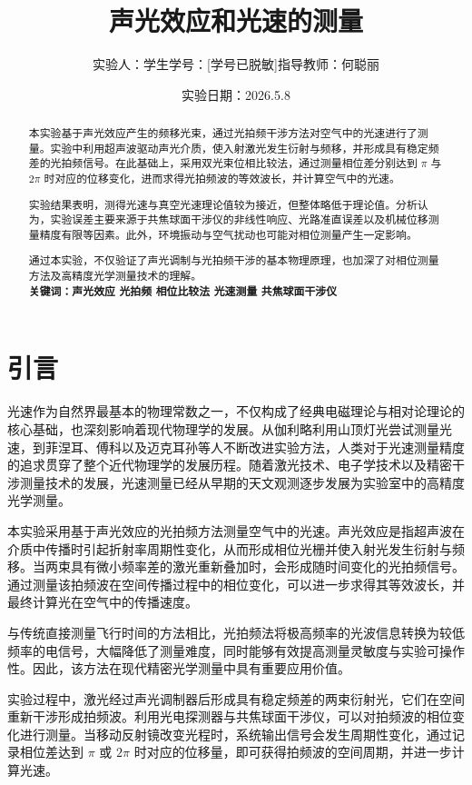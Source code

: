 \documentclass[a4paper]{ctexart}
\title{声光效应和光速的测量}
\author{实验人：学生\qquad 学号：[学号已脱敏]\qquad 指导教师：何聪丽}
\date{实验日期：2026.5.8}
\begin{document}
    
    \maketitle
    
    \begin{abstract}

本实验基于声光效应产生的频移光束，通过光拍频干涉方法对空气中的光速进行了测量。实验中利用超声波驱动声光介质，使入射激光发生衍射与频移，并形成具有稳定频差的光拍频信号。在此基础上，采用双光束位相比较法，通过测量相位差分别达到 $\pi$ 与 $2\pi$ 时对应的位移变化，进而求得光拍频波的等效波长，并计算空气中的光速。

实验结果表明，测得光速与真空光速理论值较为接近，但整体略低于理论值。分析认为，实验误差主要来源于共焦球面干涉仪的非线性响应、光路准直误差以及机械位移测量精度有限等因素。此外，环境振动与空气扰动也可能对相位测量产生一定影响。

通过本实验，不仅验证了声光调制与光拍频干涉的基本物理原理，也加深了对相位测量方法及高精度光学测量技术的理解。\\

\textbf{关键词：声光效应 \quad 光拍频 \quad 相位比较法 \quad 光速测量 \quad 共焦球面干涉仪}

\end{abstract}
    
    \section{引言}

光速作为自然界最基本的物理常数之一，不仅构成了经典电磁理论与相对论理论的核心基础，也深刻影响着现代物理学的发展。从伽利略利用山顶灯光尝试测量光速，到菲涅耳、傅科以及迈克耳孙等人不断改进实验方法，人类对于光速测量精度的追求贯穿了整个近代物理学的发展历程。随着激光技术、电子学技术以及精密干涉测量技术的发展，光速测量已经从早期的天文观测逐步发展为实验室中的高精度光学测量。

本实验采用基于声光效应的光拍频方法测量空气中的光速。声光效应是指超声波在介质中传播时引起折射率周期性变化，从而形成相位光栅并使入射光发生衍射与频移。当两束具有微小频率差的激光重新叠加时，会形成随时间变化的光拍频信号。通过测量该拍频波在空间传播过程中的相位变化，可以进一步求得其等效波长，并最终计算光在空气中的传播速度。

与传统直接测量飞行时间的方法相比，光拍频法将极高频率的光波信息转换为较低频率的电信号，大幅降低了测量难度，同时能够有效提高测量灵敏度与实验可操作性。因此，该方法在现代精密光学测量中具有重要应用价值。

实验过程中，激光经过声光调制器后形成具有稳定频差的两束衍射光，它们在空间重新干涉形成拍频波。利用光电探测器与共焦球面干涉仪，可以对拍频波的相位变化进行测量。当移动反射镜改变光程时，系统输出信号会发生周期性变化，通过记录相位差达到 $\pi$ 或 $2\pi$ 时对应的位移量，即可获得拍频波的空间周期，并进一步计算光速。
\end{document}
